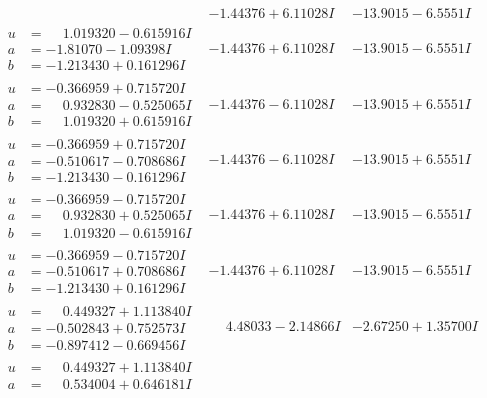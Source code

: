 \documentclass[1p]{elsarticle_modified}
\theoremstyle{definition}
\begin{document}
$$\begin{array}{c|c|c}
 & -1.44376 + 6.11028 I & -13.9015 - 6.5551 I \\ \hline\begin{aligned}
u &= \phantom{-}1.019320 - 0.615916 I \\
a &= -1.81070 - 1.09398 I \\
b &= -1.213430 + 0.161296 I\end{aligned}
 & -1.44376 + 6.11028 I & -13.9015 - 6.5551 I \\ \hline\begin{aligned}
u &= -0.366959 + 0.715720 I \\
a &= \phantom{-}0.932830 - 0.525065 I \\
b &= \phantom{-}1.019320 + 0.615916 I\end{aligned}
 & -1.44376 - 6.11028 I & -13.9015 + 6.5551 I \\ \hline\begin{aligned}
u &= -0.366959 + 0.715720 I \\
a &= -0.510617 - 0.708686 I \\
b &= -1.213430 - 0.161296 I\end{aligned}
 & -1.44376 - 6.11028 I & -13.9015 + 6.5551 I \\ \hline\begin{aligned}
u &= -0.366959 - 0.715720 I \\
a &= \phantom{-}0.932830 + 0.525065 I \\
b &= \phantom{-}1.019320 - 0.615916 I\end{aligned}
 & -1.44376 + 6.11028 I & -13.9015 - 6.5551 I \\ \hline\begin{aligned}
u &= -0.366959 - 0.715720 I \\
a &= -0.510617 + 0.708686 I \\
b &= -1.213430 + 0.161296 I\end{aligned}
 & -1.44376 + 6.11028 I & -13.9015 - 6.5551 I \\ \hline\begin{aligned}
u &= \phantom{-}0.449327 + 1.113840 I \\
a &= -0.502843 + 0.752573 I \\
b &= -0.897412 - 0.669456 I\end{aligned}
 & \phantom{-}4.48033 - 2.14866 I & -2.67250 + 1.35700 I \\ \hline\begin{aligned}
u &= \phantom{-}0.449327 + 1.113840 I \\
a &= \phantom{-}0.534004 + 0.646181 I \\

\end{aligned}
\end{array}$$
\end{document}
